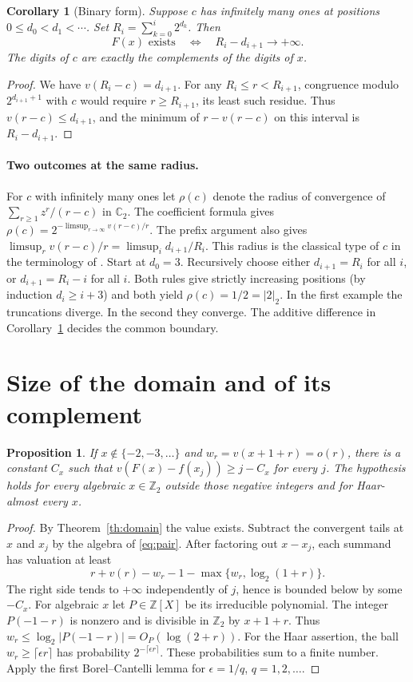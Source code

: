 \documentclass[11pt]{article}
\newtheorem{proposition}[theorem]{Proposition}
\newtheorem{corollary}[theorem]{Corollary}
\begin{document}
\begin{corollary}[Binary form]\label{th:digits}
Suppose $c$ has infinitely many ones at positions $0\le d_0<d_1<\cdots$.
Set $R_i=\sum_{k=0}^i2^{d_k}$. Then
\[
                  F(x)\text{ exists}\quad\Longleftrightarrow\quad
                               R_i-d_{i+1}\longrightarrow+\infty .
\]
The digits of $c$ are exactly the complements of the digits of $x$.
\end{corollary}
\begin{proof}
We have $v(R_i-c)=d_{i+1}$. For any $R_i\le r<R_{i+1}$,
congruence modulo $2^{d_{i+1}+1}$ with $c$ would require
$r\ge R_{i+1}$, its least such residue. Thus $v(r-c)\le d_{i+1}$,
and the minimum of $r-v(r-c)$ on this interval is $R_i-d_{i+1}$.
\end{proof}

\paragraph{Two outcomes at the same radius.}
For $c$ with infinitely many ones let $\rho(c)$ denote the radius of convergence of $\sum_{r\ge1}z^r/(r-c)$ in $\mathbb C_2$. The coefficient formula gives
$\rho(c)=2^{-\limsup_{r\to\infty}v(r-c)/r}$. The prefix argument also gives $\limsup_r v(r-c)/r=\limsup_i d_{i+1}/R_i$. This radius is the classical type of $c$ in the terminology of \cite{Kedlaya}. Start at $d_0=3$. Recursively choose either $d_{i+1}=R_i$ for all $i$, or $d_{i+1}=R_i-i$ for all $i$. Both rules give strictly increasing positions (by induction $d_i\ge i+3$) and both yield $\rho(c)=1/2=|2|_2$. In the first example the truncations diverge. In the second they converge. The additive difference in Corollary~\ref{th:digits} decides the common boundary.

\section{Size of the domain and of its complement}\label{sec:metric}

\begin{proposition}\label{dav:measure}
If $x\notin\{-2,-3,\ldots\}$ and $w_r=v(x+1+r)=o(r)$, there is a constant $C_x$ such that
$v(F(x)-f(x_j))\ge j-C_x$ for every $j$. The hypothesis holds for every algebraic $x\in\mathbb Z_2$ outside those negative integers and for Haar-almost every $x$.
\end{proposition}
\begin{proof}
By Theorem~\ref{th:domain} the value exists. Subtract the convergent tails at $x$ and $x_j$ by the algebra of \eqref{eq:pair}. After factoring out $x-x_j$, each summand has valuation at least
\[
      r+v(r)-w_r-1-\max\{w_r,\log_2(1+r)\}.
\]
The right side tends to $+\infty$ independently of $j$, hence is bounded below by some $-C_x$. For algebraic $x$ let $P\in\mathbb Z[X]$ be its irreducible polynomial. The integer $P(-1-r)$ is nonzero and is divisible in $\mathbb Z_2$ by $x+1+r$. Thus $w_r\le\log_2|P(-1-r)|=O_P(\log(2+r))$. For the Haar assertion, the ball $w_r\ge\lceil\epsilon r\rceil$ has probability $2^{-\lceil\epsilon r\rceil}$. These probabilities sum to a finite number. Apply the first Borel--Cantelli lemma for $\epsilon=1/q$, $q=1,2,\ldots$.
\end{proof}
\end{document}
